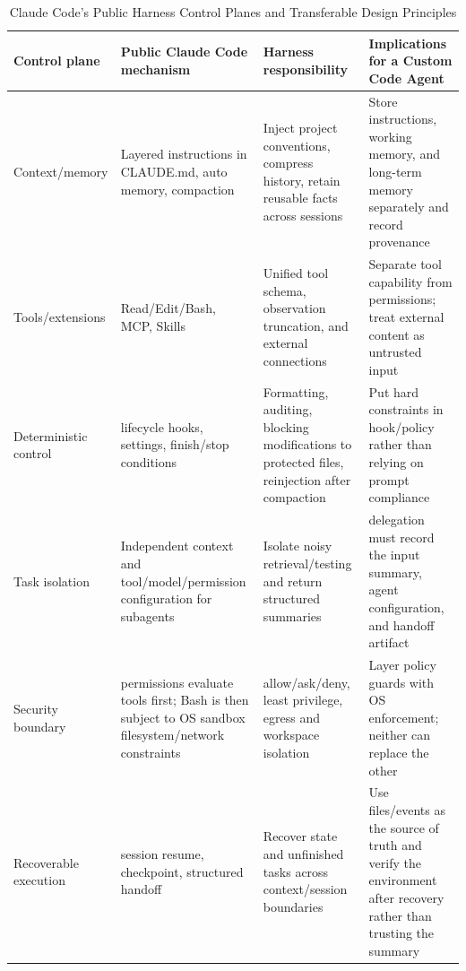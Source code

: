 \documentclass[10pt,a4paper,UTF8,fontset=none]{ctexart}
\newcommand{\ident}[1]{{\rmfamily #1}}
\begin{document}
\begin{table}[htbp]
\centering
\caption{Claude Code's Public Harness Control Planes and Transferable Design Principles}
\label{tab:claude-code-public-architecture}
\small
\begin{tabularx}{\textwidth}{p{2.4cm}p{4.2cm}Y Y}
\toprule
Control plane & Public Claude Code mechanism & Harness responsibility & Implications for a Custom Code Agent \\
\midrule
Context/memory & Layered instructions in \ident{CLAUDE.md}, auto memory, compaction & Inject project conventions, compress history, retain reusable facts across sessions & Store instructions, working memory, and long-term memory separately and record provenance\cite{claudecodememory2026} \\
Tools/extensions & Read/Edit/Bash, MCP, Skills & Unified tool schema, observation truncation, and external connections & Separate tool capability from permissions; treat external content as untrusted input \\
Deterministic control & lifecycle hooks, settings, finish/stop conditions & Formatting, auditing, blocking modifications to protected files, reinjection after compaction & Put hard constraints in hook/policy rather than relying on prompt compliance\cite{claudecodehooks2026} \\
Task isolation & Independent context and tool/model/permission configuration for subagents & Isolate noisy retrieval/testing and return structured summaries & delegation must record the input summary, agent configuration, and handoff artifact\cite{claudecodesubagents2026} \\
Security boundary & permissions evaluate tools first; Bash is then subject to OS sandbox filesystem/network constraints & allow/ask/deny, least privilege, egress and workspace isolation & Layer policy guards with OS enforcement; neither can replace the other\cite{claudecodesandbox2026} \\
Recoverable execution & session resume, checkpoint, structured handoff & Recover state and unfinished tasks across context/session boundaries & Use files/events as the source of truth and verify the environment after recovery rather than trusting the summary \\
\bottomrule
\end{tabularx}
\end{table}
\end{document}
